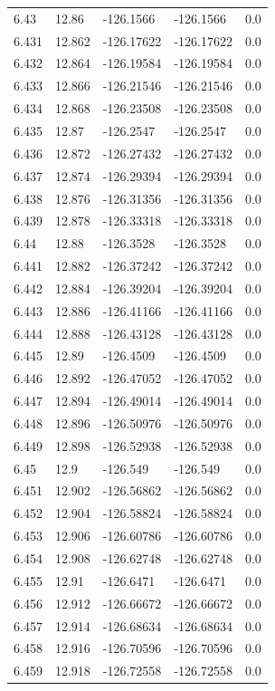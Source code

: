 \begin{tabular}{lllll}
6.43 & 12.86 & -126.1566 & -126.1566 & 0.0 \\
6.431 & 12.862 & -126.17622 & -126.17622 & 0.0 \\
6.432 & 12.864 & -126.19584 & -126.19584 & 0.0 \\
6.433 & 12.866 & -126.21546 & -126.21546 & 0.0 \\
6.434 & 12.868 & -126.23508 & -126.23508 & 0.0 \\
6.435 & 12.87 & -126.2547 & -126.2547 & 0.0 \\
6.436 & 12.872 & -126.27432 & -126.27432 & 0.0 \\
6.437 & 12.874 & -126.29394 & -126.29394 & 0.0 \\
6.438 & 12.876 & -126.31356 & -126.31356 & 0.0 \\
6.439 & 12.878 & -126.33318 & -126.33318 & 0.0 \\
6.44 & 12.88 & -126.3528 & -126.3528 & 0.0 \\
6.441 & 12.882 & -126.37242 & -126.37242 & 0.0 \\
6.442 & 12.884 & -126.39204 & -126.39204 & 0.0 \\
6.443 & 12.886 & -126.41166 & -126.41166 & 0.0 \\
6.444 & 12.888 & -126.43128 & -126.43128 & 0.0 \\
6.445 & 12.89 & -126.4509 & -126.4509 & 0.0 \\
6.446 & 12.892 & -126.47052 & -126.47052 & 0.0 \\
6.447 & 12.894 & -126.49014 & -126.49014 & 0.0 \\
6.448 & 12.896 & -126.50976 & -126.50976 & 0.0 \\
6.449 & 12.898 & -126.52938 & -126.52938 & 0.0 \\
6.45 & 12.9 & -126.549 & -126.549 & 0.0 \\
6.451 & 12.902 & -126.56862 & -126.56862 & 0.0 \\
6.452 & 12.904 & -126.58824 & -126.58824 & 0.0 \\
6.453 & 12.906 & -126.60786 & -126.60786 & 0.0 \\
6.454 & 12.908 & -126.62748 & -126.62748 & 0.0 \\
6.455 & 12.91 & -126.6471 & -126.6471 & 0.0 \\
6.456 & 12.912 & -126.66672 & -126.66672 & 0.0 \\
6.457 & 12.914 & -126.68634 & -126.68634 & 0.0 \\
6.458 & 12.916 & -126.70596 & -126.70596 & 0.0 \\
6.459 & 12.918 & -126.72558 & -126.72558 & 0.0 \\

\end{tabular}
